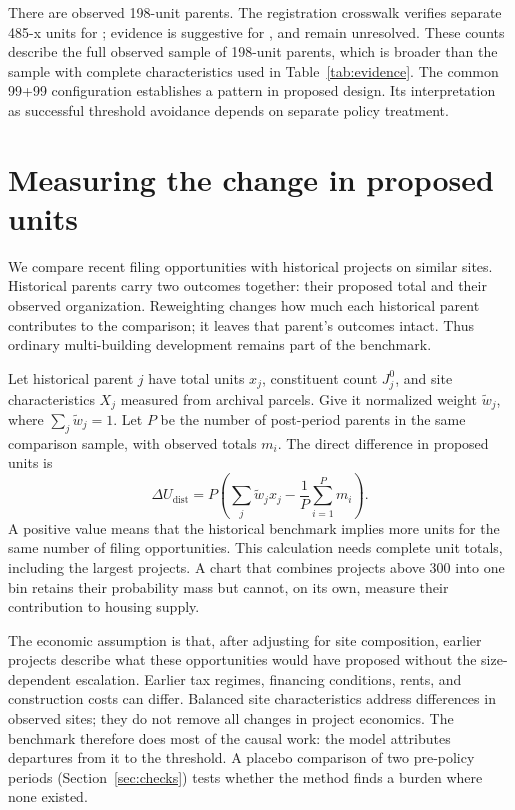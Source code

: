 \documentclass[11pt]{article}
\begin{document}
There are \ExactOneNinetyEightParents{} observed 198-unit parents. The registration crosswalk verifies separate 485-x units for \VerifiedOneNinetyEight{}; evidence is suggestive for \SuggestiveOneNinetyEight{}, and \UnresolvedOneNinetyEight{} remain unresolved. These counts describe the full observed sample of 198-unit parents, which is broader than the sample with complete characteristics used in Table~\ref{tab:evidence}. The common 99+99 configuration establishes a pattern in proposed design. Its interpretation as successful threshold avoidance depends on separate policy treatment.

\section{Measuring the change in proposed units}

We compare recent filing opportunities with historical projects on similar sites. Historical parents carry two outcomes together: their proposed total and their observed organization. Reweighting changes how much each historical parent contributes to the comparison; it leaves that parent's outcomes intact. Thus ordinary multi-building development remains part of the benchmark.

Let historical parent $j$ have total units $x_j$, constituent count $J_j^0$, and site characteristics $X_j$ measured from archival parcels. Give it normalized weight $\widetilde w_j$, where $\sum_j\widetilde w_j=1$. Let $P$ be the number of post-period parents in the same comparison sample, with observed totals $m_i$. The direct difference in proposed units is
\begin{equation}
\Delta U_{\mathrm{dist}}
=P\left(\sum_j\widetilde w_jx_j-\frac{1}{P}\sum_{i=1}^{P}m_i\right).
\label{eq:direct}
\end{equation}
A positive value means that the historical benchmark implies more units for the same number of filing opportunities. This calculation needs complete unit totals, including the largest projects. A chart that combines projects above 300 into one bin retains their probability mass but cannot, on its own, measure their contribution to housing supply.

The economic assumption is that, after adjusting for site composition, earlier projects describe what these opportunities would have proposed without the size-dependent escalation. Earlier tax regimes, financing conditions, rents, and construction costs can differ. Balanced site characteristics address differences in observed sites; they do not remove all changes in project economics. The benchmark therefore does most of the causal work: the model attributes departures from it to the threshold. A placebo comparison of two pre-policy periods (Section~\ref{sec:checks}) tests whether the method finds a burden where none existed.
\end{document}
